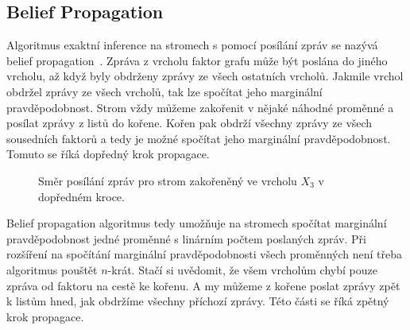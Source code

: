 \subsection{Belief Propagation}

Algoritmus exaktní inference na stromech s pomocí posílání zpráv se nazývá belief propagation~\cite{pearl1988probabilistic}.
Zpráva z vrcholu faktor grafu může být poslána do jiného vrcholu, až když byly obdrženy zprávy ze všech ostatních vrcholů.
Jakmile vrchol obdržel zprávy ze všech vrcholů, tak lze spočítat jeho marginální pravděpodobnost.
Strom vždy můžeme zakořenit v nějaké náhodné proměnné a posílat zprávy z listů do kořene.
Kořen pak obdrží všechny zprávy ze všech sousedních faktorů a tedy je možné spočítat jeho marginální pravděpodobnost.
Tomuto se říká dopředný krok propagace.

\begin{figure}[H]
\begin{center}
\end{center}
\caption{Směr posílání zpráv pro strom zakořeněný ve vrcholu $X_3$ v dopředném kroce.}
\end{figure}

Belief propagation algoritmus tedy umožňuje na stromech spočítat marginální pravděpodobnost jedné proměnné s linárním počtem poslaných zpráv.
Při rozšíření na spočítání marginální pravděpodobnosti všech proměnných není třeba algoritmus pouštět $n$-krát.
Stačí si uvědomit, že všem vrcholům chybí pouze zpráva od faktoru na cestě ke kořenu.
A my můžeme z kořene poslat zprávy zpět k listům hned, jak obdržíme všechny příchozí zprávy.
Této části se říká zpětný krok propagace.

